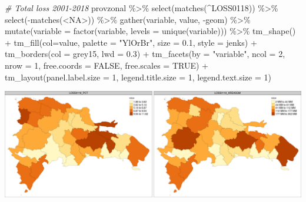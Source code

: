 \documentclass[10pt,landscape,a3paper]{article}
\newenvironment{Shaded}{\begin{snugshade}}{\end{snugshade}}
\newcommand{\AttributeTok}[1]{\textcolor[rgb]{0.77,0.63,0.00}{#1}}
\newcommand{\CommentTok}[1]{\textcolor[rgb]{0.56,0.35,0.01}{\textit{#1}}}
\newcommand{\ConstantTok}[1]{\textcolor[rgb]{0.00,0.00,0.00}{#1}}
\newcommand{\DecValTok}[1]{\textcolor[rgb]{0.00,0.00,0.81}{#1}}
\newcommand{\FloatTok}[1]{\textcolor[rgb]{0.00,0.00,0.81}{#1}}
\newcommand{\FunctionTok}[1]{\textcolor[rgb]{0.00,0.00,0.00}{#1}}
\newcommand{\NormalTok}[1]{#1}
\newcommand{\SpecialCharTok}[1]{\textcolor[rgb]{0.00,0.00,0.00}{#1}}
\newcommand{\StringTok}[1]{\textcolor[rgb]{0.31,0.60,0.02}{#1}}
\begin{document}
\begin{Shaded}
\begin{Highlighting}[]

\CommentTok{\# Total loss 2001{-}2018}
\NormalTok{provzonal }\SpecialCharTok{\%\textgreater{}\%} \FunctionTok{select}\NormalTok{(}\FunctionTok{matches}\NormalTok{(}\StringTok{\textquotesingle{}\^{}LOSS0118\textquotesingle{}}\NormalTok{)) }\SpecialCharTok{\%\textgreater{}\%} \FunctionTok{select}\NormalTok{(}\SpecialCharTok{{-}}\FunctionTok{matches}\NormalTok{(}\StringTok{\textquotesingle{}\textless{}NA\textgreater{}\textquotesingle{}}\NormalTok{)) }\SpecialCharTok{\%\textgreater{}\%} 
  \FunctionTok{gather}\NormalTok{(variable, value, }\SpecialCharTok{{-}}\NormalTok{geom) }\SpecialCharTok{\%\textgreater{}\%}
  \FunctionTok{mutate}\NormalTok{(}\AttributeTok{variable =} \FunctionTok{factor}\NormalTok{(variable, }\AttributeTok{levels =} \FunctionTok{unique}\NormalTok{(variable))) }\SpecialCharTok{\%\textgreater{}\%} 
  \FunctionTok{tm\_shape}\NormalTok{() }\SpecialCharTok{+}
    \FunctionTok{tm\_fill}\NormalTok{(}\AttributeTok{col=}\StringTok{\textquotesingle{}value\textquotesingle{}}\NormalTok{, }\AttributeTok{palette =} \StringTok{"YlOrBr"}\NormalTok{, }\AttributeTok{size =} \FloatTok{0.1}\NormalTok{, }\AttributeTok{style =} \StringTok{\textquotesingle{}jenks\textquotesingle{}}\NormalTok{) }\SpecialCharTok{+}
    \FunctionTok{tm\_borders}\NormalTok{(}\AttributeTok{col =} \StringTok{\textquotesingle{}grey15\textquotesingle{}}\NormalTok{, }\AttributeTok{lwd =} \FloatTok{0.3}\NormalTok{) }\SpecialCharTok{+}
    \FunctionTok{tm\_facets}\NormalTok{(}\AttributeTok{by =} \StringTok{"variable"}\NormalTok{, }\AttributeTok{ncol =} \DecValTok{2}\NormalTok{, }\AttributeTok{nrow =} \DecValTok{1}\NormalTok{, }\AttributeTok{free.coords =} \ConstantTok{FALSE}\NormalTok{, }\AttributeTok{free.scales =} \ConstantTok{TRUE}\NormalTok{) }\SpecialCharTok{+}
    \FunctionTok{tm\_layout}\NormalTok{(}\AttributeTok{panel.label.size =} \DecValTok{1}\NormalTok{, }\AttributeTok{legend.title.size =} \DecValTok{1}\NormalTok{, }\AttributeTok{legend.text.size =} \DecValTok{1}\NormalTok{)}
\end{Highlighting}
\end{Shaded}

\begin{center}\includegraphics{img/zonal-prov-4} \end{center}
\end{document}

